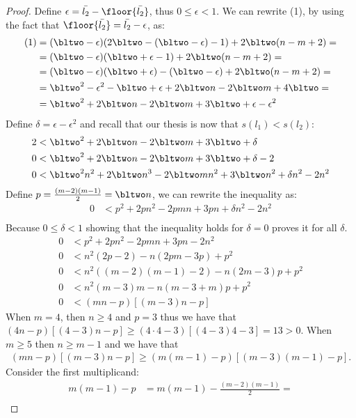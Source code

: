 \begin{proof}
	Define $\epsilon = \bar{l_2} - \floor{\bar{l_2}}$, thus $0 ≤ \epsilon < 1$. We can rewrite (1), by using the fact that $\floor{\bar{l_2}} = \bar{l_2} - \epsilon$, as:
	\begin{align*}
		(1)&= (\bltwo-\epsilon)(2\bltwo-(\bltwo-\epsilon)-1)+2\bltwo(n-m+2)=\\
		&= (\bltwo-\epsilon)(\bltwo+\epsilon-1)+2\bltwo(n-m+2)=\\
		&= (\bltwo-\epsilon)(\bltwo+\epsilon)-(\bltwo-\epsilon)+2\bltwo(n-m+2)=\\
		&= \bltwo^2-\epsilon^2-\bltwo+\epsilon+2\bltwo n-2\bltwo m+4\bltwo=\\
		&= \bltwo^2+2\bltwo n-2\bltwo m+3\bltwo+\epsilon-\epsilon^2\\
	\end{align*}
	\hfuzz=4cm
	Define $\delta=\epsilon-\epsilon^2$ and recall that our thesis is now that $s(l_1)<s(l_2)$:
	\begin{align*}
		2&< \bltwo^2+2\bltwo n-2\bltwo m+3\bltwo+\delta\\
		0&< \bltwo^2+2\bltwo n-2\bltwo m+3\bltwo+\delta-2\\
		0&< \bltwo^2 n^2+2\bltwo n^3-2\bltwo m n^2+3\bltwo n^2+\delta n^2-2 n^2\\
	\end{align*}
	Define $p=\frac{(m-2)(m-1)}{2}=\bltwo n$, we can rewrite the inequality as: 
	\begin{align*}
		0&< p^2+2p n^2-2p m n+3p n+\delta n^2-2 n^2\\
	\end{align*}
	Because $0 \leq \delta < 1$ showing that the inequality holds for $\delta=0$ proves it for all $\delta$.
	\begin{align*}
		0&< p^2+2p n^2-2p m n+3p n-2 n^2\\
		0&< n^2(2p-2)-n(2pm-3p)+p^2\\
		0&< n^2((m-2)(m-1)-2)-n(2m-3)p+p^2\\
		0&< n^2(m-3)m-n(m-3+m)p+p^2\\
		0&< (mn-p)[(m-3)n-p]
	\end{align*}
	When $m=4$, then $n\geq4$ and $p=3$ thus we have that $(4n-p)[(4-3)n-p]\geq(4 \cdot 4-3)[(4-3)4-3]=13>0$. When $m\geq5$ then $n ≥ m - 1$ and we have that
	\begin{align*}
		(mn-p)[(m-3)n-p] \geq (m(m-1)-p)[(m-3)(m-1)-p]. 
	\end{align*}
	Consider the first multiplicand:
	\begin{align*}
		m(m-1)-p &= m(m-1)-\frac{(m-2)(m-1)}{2}= \\

\end{align*}
\end{proof}
